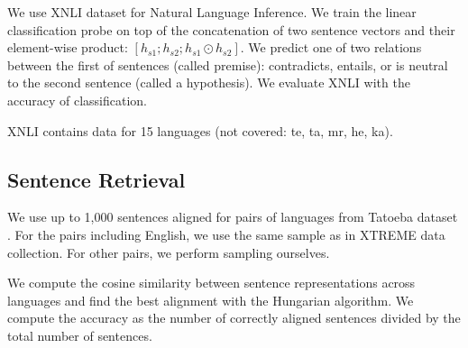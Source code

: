 We use XNLI dataset \cite{conneau_xnli_2018} for Natural Language Inference. We train the linear classification probe on top of the concatenation of two sentence vectors and their element-wise product: $[h_{s1}; h_{s2}; h_{s1} \odot h_{s2}]$. We predict one of two relations between the first of sentences (called premise): contradicts, entails, or is neutral to the second sentence (called a hypothesis). We evaluate XNLI with the accuracy of classification.

XNLI contains data for 15 languages (not covered: te, ta, mr, he, ka).

\subsection{Sentence Retrieval}
We use up to 1,000 sentences aligned for pairs of languages from Tatoeba dataset \cite{artetxe_massively_2019}. For the pairs including English, we use the same sample as in XTREME data collection. For other pairs, we perform sampling ourselves. 

We compute the cosine similarity between sentence representations across languages and find the best alignment with the Hungarian algorithm\cite{kuhn_hungarian_1955}. We compute the accuracy as the number of correctly aligned sentences divided by the total number of sentences.
